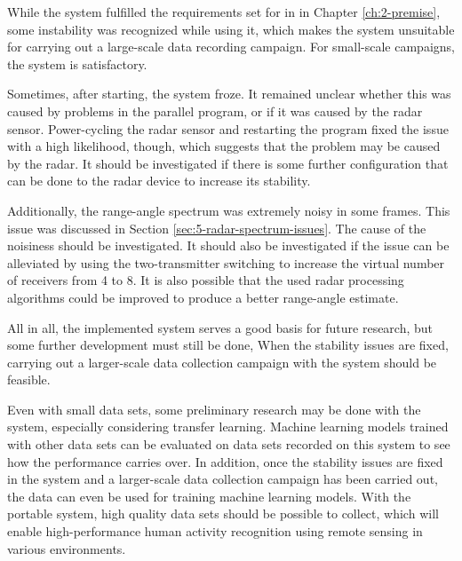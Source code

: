 While the system fulfilled the requirements set for in in Chapter \ref{ch:2-premise},
some instability was recognized while using it,
which makes the system unsuitable for carrying out a large-scale data recording campaign.
For small-scale campaigns, the system is satisfactory.

Sometimes, after starting, the system froze.
It remained unclear whether this was caused by problems in the parallel program,
or if it was caused by the radar sensor.
Power-cycling the radar sensor and restarting the program fixed the issue with a high likelihood, though,
which suggests that the problem may be caused by the radar.
It should be investigated if there is some further configuration that can be done to the radar device to increase its stability.

Additionally, the range-angle spectrum was extremely noisy in some frames.
This issue was discussed in Section \ref{sec:5-radar-spectrum-issues}.
The cause of the noisiness should be investigated.
It should also be investigated if the issue can be alleviated by using the two-transmitter switching to increase the virtual number
of receivers from 4 to 8.
It is also possible that the used radar processing algorithms could be improved to produce a better range-angle estimate.

All in all, the implemented system serves a good basis for future research,
but some further development must still be done,
When the stability issues are fixed,
carrying out a larger-scale data collection campaign with the system should be feasible.

Even with small data sets, some preliminary research may be done with the system, especially considering transfer learning.
Machine learning models trained with other data sets can be evaluated on data sets recorded on this system to see how the performance carries over.
In addition, once the stability issues are fixed in the system and a larger-scale data collection campaign has been carried out,
the data can even be used for training machine learning models.
With the portable system, high quality data sets should be possible to collect,
which will enable high-performance human activity recognition using remote sensing in various environments.